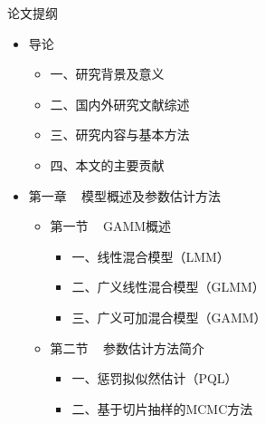 \documentclass[ignorenonframetext,11pt,xcolor=dvipsnames,aspectratio=1610,hyperref={bookmarksdepth=4}]{beamer}
\providecommand{\tightlist}{%
  \setlength{\itemsep}{0pt}\setlength{\parskip}{0pt}}
\begin{document}
\begin{frame}{论文提纲}

\begin{itemize}
\tightlist
\item
  导论

  \begin{itemize}
  \tightlist
  \item
    一、研究背景及意义
  \item
    二、国内外研究文献综述
  \item
    三、研究内容与基本方法
  \item
    四、本文的主要贡献
  \end{itemize}
\item
  第一章 ~ 模型概述及参数估计方法

  \begin{itemize}
  \tightlist
  \item
    第一节 ~ GAMM概述

    \begin{itemize}
    \tightlist
    \item
      一、线性混合模型（LMM）
    \item
      二、广义线性混合模型（GLMM）
    \item
      三、广义可加混合模型（GAMM）
    \end{itemize}
  \item
    第二节 ~ 参数估计方法简介

    \begin{itemize}
    \tightlist
    \item
      一、惩罚拟似然估计（PQL）
    \item
      二、基于切片抽样的MCMC方法
    \end{itemize}
  \end{itemize}
\end{itemize}

\end{frame}
\end{document}
